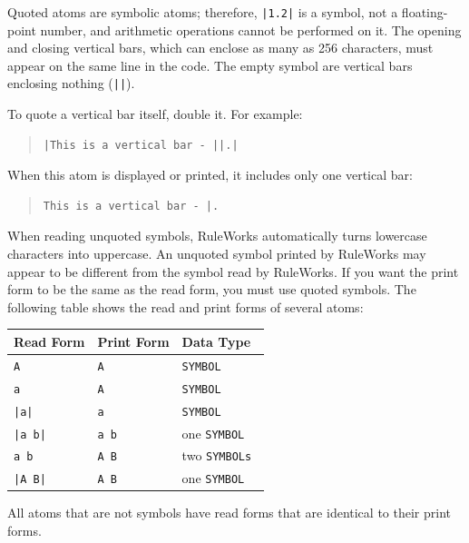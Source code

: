 Quoted atoms are symbolic atoms; therefore, \verb,|1.2|, is a symbol,
not a floating-point number, and arithmetic operations cannot be
performed on it. The opening and closing vertical bars, which can
enclose as many as 256 characters, must appear on the same line in the
code. The empty symbol are vertical bars enclosing nothing
(\verb,||,).

To quote a vertical bar itself, double it. For example:

\begin{quote}
\begin{verbatim}
|This is a vertical bar - ||.|
\end{verbatim}
\end{quote}

When this atom is displayed or printed, it includes only one
vertical bar:

\begin{quote}
\begin{verbatim}
This is a vertical bar - |.
\end{verbatim}
\end{quote}

When reading unquoted symbols, RuleWorks automatically turns lowercase
characters into uppercase. An unquoted symbol printed by RuleWorks may
appear to be different from the symbol read by RuleWorks. If you want
the print form to be the same as the read form, you must use quoted
symbols. The following table shows the read and print forms of several
atoms:

\begin{center}
  \begin{tabular}{lll}
    \toprule
    Read Form & Print Form & Data Type \\
    \midrule
    \verb,A, &  \verb,A, & \tt{SYMBOL} \\
    \verb,a,        & \verb,A,          & \tt{SYMBOL} \\
    \verb,|a|,       & \verb,a,          & \tt{SYMBOL} \\
    \verb,|a b|,     & \verb,a b,        & one \tt{SYMBOL} \\
    \verb,a b,       & \verb,A B,        & two \tt{SYMBOL}s \\
    \verb,|A B|,     & \verb,A B,        & one \tt{SYMBOL} \\
  \bottomrule
  \end{tabular}
\end{center}

All atoms that are not symbols have read forms that are identical to
their print forms.

